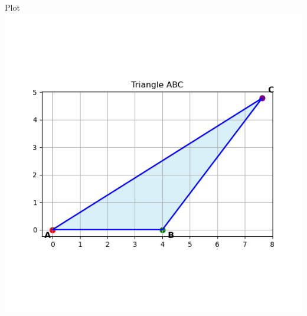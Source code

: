 \documentclass{beamer}
\begin{document}
\begin{frame}{Plot}
    \centering
    \includegraphics[width=\columnwidth, height=0.8\textheight, keepaspectratio]{Figure_5.png}     
\end{frame}
\end{document}
